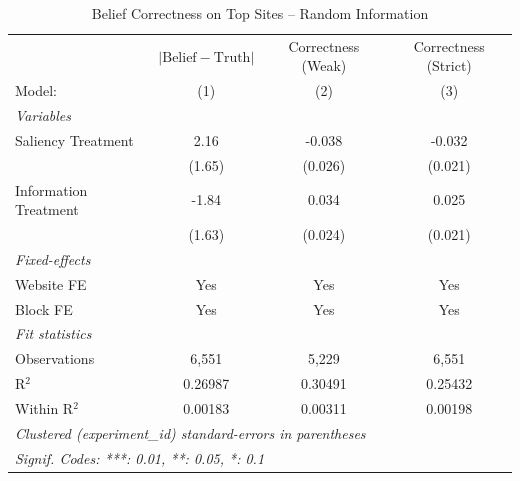 
\begin{table}[htbp]
   \caption{Belief Correctness on Top Sites -- Random Information}
   \centering
   \begin{tabular}{lccc}
      \tabularnewline \midrule \midrule
                            & $\lvert \text{Belief} - \text{Truth} \rvert$     & Correctness (Weak) & Correctness (Strict) \\   
      Model:                & (1)                                              & (2)                & (3)\\  
      \midrule
      \emph{Variables}\\
      Saliency Treatment    & 2.16                                             & -0.038             & -0.032\\   
                            & (1.65)                                           & (0.026)            & (0.021)\\   
      Information Treatment & -1.84                                            & 0.034              & 0.025\\   
                            & (1.63)                                           & (0.024)            & (0.021)\\   
      \midrule
      \emph{Fixed-effects}\\
      Website FE            & Yes                                              & Yes                & Yes\\  
      Block FE              & Yes                                              & Yes                & Yes\\  
      \midrule
      \emph{Fit statistics}\\
      Observations          & 6,551                                            & 5,229              & 6,551\\  
      R$^2$                 & 0.26987                                          & 0.30491            & 0.25432\\  
      Within R$^2$          & 0.00183                                          & 0.00311            & 0.00198\\  
      \midrule \midrule
      \multicolumn{4}{l}{\emph{Clustered (experiment\_id) standard-errors in parentheses}}\\
      \multicolumn{4}{l}{\emph{Signif. Codes: ***: 0.01, **: 0.05, *: 0.1}}\\
   \end{tabular}
\end{table}


